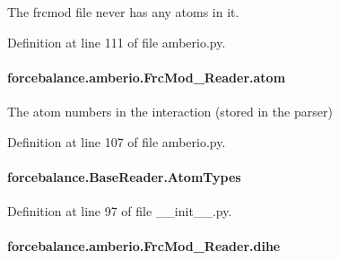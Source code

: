 The frcmod file never has any atoms in it. 



Definition at line 111 of file amberio.\-py.

\hypertarget{classforcebalance_1_1amberio_1_1FrcMod__Reader_a2e670a076d15771ee362f76e04a80419}{
\paragraph[{atom}]{\setlength{\rightskip}{0pt plus 5cm}forcebalance.\-amberio.\-Frc\-Mod\-\_\-\-Reader.\-atom}}\label{classforcebalance_1_1amberio_1_1FrcMod__Reader_a2e670a076d15771ee362f76e04a80419}


The atom numbers in the interaction (stored in the parser) 



Definition at line 107 of file amberio.\-py.

\hypertarget{classforcebalance_1_1BaseReader_a69ca7d949a4a3df4d9f61e617fe0e270}{
\paragraph[{Atom\-Types}]{\setlength{\rightskip}{0pt plus 5cm}forcebalance.\-Base\-Reader.\-Atom\-Types\hspace{0.3cm}{\ttfamily [inherited]}}}\label{classforcebalance_1_1BaseReader_a69ca7d949a4a3df4d9f61e617fe0e270}


Definition at line 97 of file \-\_\-\-\_\-init\-\_\-\-\_\-.\-py.

\hypertarget{classforcebalance_1_1amberio_1_1FrcMod__Reader_aa5326c1d9f32593724d4582e415b7771}{
\paragraph[{dihe}]{\setlength{\rightskip}{0pt plus 5cm}forcebalance.\-amberio.\-Frc\-Mod\-\_\-\-Reader.\-dihe}}\label{classforcebalance_1_1amberio_1_1FrcMod__Reader_aa5326c1d9f32593724d4582e415b7771}


